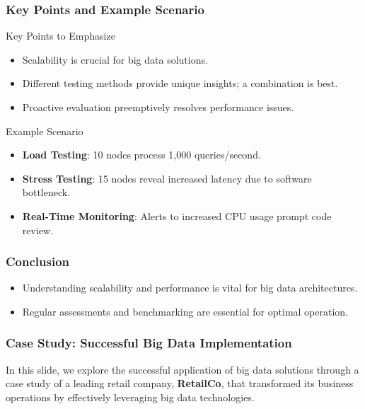 \documentclass[aspectratio=169]{beamer}
\begin{document}
\begin{frame}[fragile]
    \frametitle{Key Points and Example Scenario}
    \begin{block}{Key Points to Emphasize}
        \begin{itemize}
            \item Scalability is crucial for big data solutions.
            \item Different testing methods provide unique insights; a combination is best.
            \item Proactive evaluation preemptively resolves performance issues.
        \end{itemize}
    \end{block}

    \begin{block}{Example Scenario}
        \begin{itemize}
            \item \textbf{Load Testing}: 10 nodes process 1,000 queries/second.
            \item \textbf{Stress Testing}: 15 nodes reveal increased latency due to software bottleneck.
            \item \textbf{Real-Time Monitoring}: Alerts to increased CPU usage prompt code review.
        \end{itemize}
    \end{block}
\end{frame}

\begin{frame}[fragile]
    \frametitle{Conclusion}
    \begin{itemize}
        \item Understanding scalability and performance is vital for big data architectures.
        \item Regular assessments and benchmarking are essential for optimal operation.
    \end{itemize}
\end{frame}

\begin{frame}[fragile]
    \frametitle{Case Study: Successful Big Data Implementation}
    In this slide, we explore the successful application of big data solutions through a case study of a leading retail company, \textbf{RetailCo}, that transformed its business operations by effectively leveraging big data technologies.
\end{frame}
\end{document}
